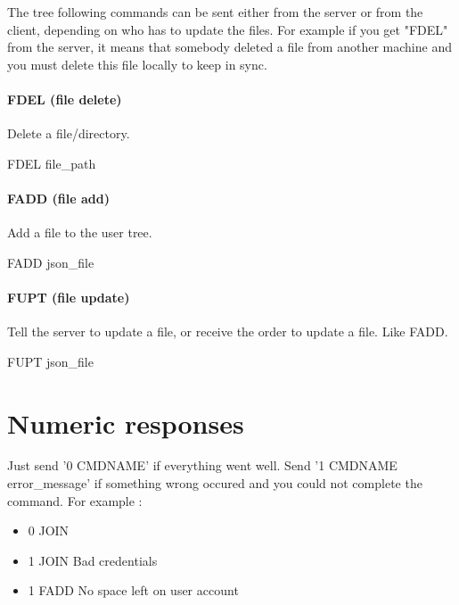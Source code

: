\documentclass{article}
\begin{document}
The tree following commands can be sent either from the server or from the client, depending on who has to update the files. For example if you get "FDEL" from the server, it means that somebody deleted a file from another machine and you must delete this file locally to keep in sync.
\paragraph{FDEL (file delete)}

Delete a file/directory.\\

\begin{center}FDEL file\_path\end{center}

\paragraph{FADD (file add)}

Add a file to the user tree.

\begin{center}FADD json\_file\end{center}

\paragraph{FUPT (file update)}

Tell the server to update a file, or receive the order to update a file. Like FADD.

\begin{center}FUPT json\_file\end{center}

\section{Numeric responses}

Just send '0 CMDNAME' if everything went well. Send '1 CMDNAME error\_message' if something wrong occured and you could not complete the command. For example :
\begin{itemize}
  \item 0 JOIN
  \item 1 JOIN Bad credentials
  \item 1 FADD No space left on user account
\end{itemize}
\end{document}
